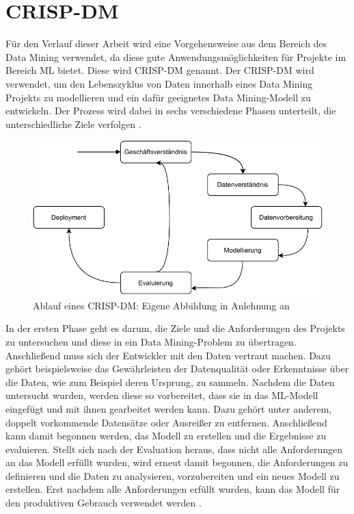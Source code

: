 \chapter{CRISP-DM}\label{chp:crisp}

Für den Verlauf dieser Arbeit wird eine Vorgehensweise aus dem Bereich des Data Mining verwendet, da diese gute Anwendungsmöglichkeiten für Projekte im Bereich ML bietet. Diese wird \ac{CRISP-DM} genannt. Der CRISP-DM wird verwendet, um den Lebenszyklus von Daten innerhalb eines Data Mining Projekts zu modellieren und ein dafür geeignetes Data Mining-Modell zu entwickeln. Der Prozess wird dabei in sechs verschiedene Phasen unterteilt, die unterschiedliche Ziele verfolgen \parencite[vgl.][S. 1]{.Wirth}.

\begin{figure}[H]
	\centering
	\includegraphics[scale=0.9]{images/CRISP.pdf}
	\caption{Ablauf eines CRISP-DM: Eigene Abbildung in Anlehnung an \parencite[][S. 5]{.Wirth}}
	\label{figure:ablauf-crisp-dm}
\end{figure}

In der ersten Phase geht es darum, die Ziele und die Anforderungen des Projekts zu untersuchen und diese in ein Data Mining-Problem zu übertragen. Anschließend muss sich der Entwickler mit den Daten vertraut machen. Dazu gehört beispielsweise das Gewährleisten der Datenqualität oder Erkenntnisse über die Daten, wie zum Beispiel deren Ursprung, zu sammeln. Nachdem die Daten untersucht wurden, werden diese so vorbereitet, dass sie in das ML-Modell eingefügt und mit ihnen gearbeitet werden kann. Dazu gehört unter anderem, doppelt vorkommende Datensätze oder Ausreißer zu entfernen. Anschließend kann damit begonnen werden, das Modell zu erstellen und die Ergebnisse zu evaluieren. Stellt sich nach der Evaluation heraus, dass nicht alle Anforderungen an das Modell erfüllt wurden, wird erneut damit begonnen, die Anforderungen zu definieren und die Daten zu analysieren, vorzubereiten und ein neues Modell zu erstellen. Erst nachdem alle Anforderungen erfüllt wurden, kann das Modell für den produktiven Gebrauch verwendet werden \parencite[vgl.][S. 5ff.]{.Wirth}.


